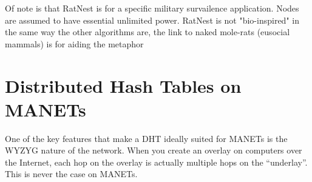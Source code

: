 \documentclass[a4paper]{article}
\begin{document}
Of note is that RatNest is for a specific military survailence application.  Nodes are assumed to have essential unlimited power.
RatNest is not "bio-inspired" in the same way the other algorithms are, the link to naked mole-rats (eusocial mammals) is for aiding the metaphor

\section{Distributed Hash Tables on MANETs}
One of the key features that make a DHT ideally suited for MANETs is the WYZYG nature of the network.  When you create an overlay on computers over the Internet, each hop on the overlay is actually multiple hops on the ``underlay''.  This is never the case on MANETs.







\end{document}
